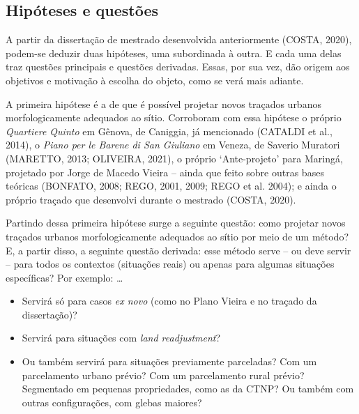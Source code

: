 \documentclass[twoside, 12pt, english,italian,latin,greek,french,spanish,brazil]{book}
\begin{document}
    \subsection{Hipóteses e questões}	 

        A partir da dissertação de mestrado desenvolvida anteriormente (COSTA, 2020), podem-se deduzir duas hipóteses, uma subordinada à outra. E cada uma delas traz questões principais e questões derivadas. Essas, por sua vez, dão origem aos objetivos e motivação à escolha do objeto, como se verá mais adiante.

        A primeira hipótese é a de que é possível projetar novos traçados urbanos morfologicamente adequados ao sítio. Corroboram com essa hipótese o próprio \textit{Quartiere Quinto} em Gênova, de Caniggia, já mencionado (CATALDI et al., 2014), o \textit{Piano per le Barene di San Giuliano} em Veneza, de Saverio Muratori (MARETTO, 2013; OLIVEIRA, 2021), o próprio ‘Ante-projeto’ para Maringá, projetado por Jorge de Macedo Vieira – ainda que feito sobre outras bases teóricas (BONFATO, 2008; REGO, 2001, 2009; REGO et al. 2004); e ainda o próprio traçado que desenvolvi durante o mestrado (COSTA, 2020). 

        Partindo dessa primeira hipótese surge a seguinte questão: como projetar novos traçados urbanos morfologicamente adequados ao sítio por meio de um método? E, a partir disso, a seguinte questão derivada: esse método serve – ou deve servir – para todos os contextos (situações reais) ou apenas para algumas situações específicas? Por exemplo: 
        \dots
            \begin{itemize}
                \item Servirá só para casos \textit{ex novo} (como no Plano Vieira e no traçado da dissertação)? 
                \item Servirá para situações com \textit{land readjustment}?
                \item Ou também servirá para situações previamente parceladas?
                    \subitem Com um parcelamento urbano prévio?
	                Com um parcelamento rural prévio?
	                    \subsubitem Segmentado em pequenas propriedades, como as da CTNP?
                        \subsubitem Ou também com outras configurações, com glebas maiores?
            \end{itemize}
\end{document}
